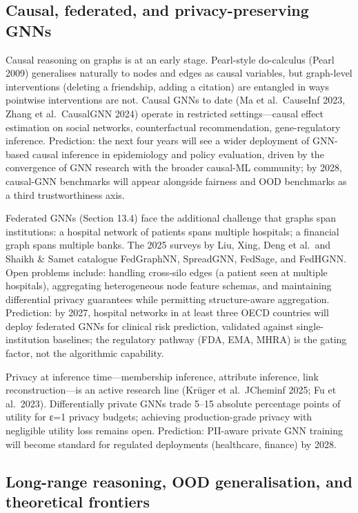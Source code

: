\subsection{Causal, federated, and privacy-preserving GNNs}\label{causal-federated-and-privacy-preserving-gnns}

Causal reasoning on graphs is at an early stage. Pearl-style do-calculus (Pearl 2009) generalises naturally to nodes and edges as causal variables, but graph-level interventions (deleting a friendship, adding a citation) are entangled in ways pointwise interventions are not. Causal GNNs to date (Ma et al.~CauseInf 2023, Zhang et al.~CausalGNN 2024) operate in restricted settings---causal effect estimation on social networks, counterfactual recommendation, gene-regulatory inference. Prediction: the next four years will see a wider deployment of GNN-based causal inference in epidemiology and policy evaluation, driven by the convergence of GNN research with the broader causal-ML community; by 2028, causal-GNN benchmarks will appear alongside fairness and OOD benchmarks as a third trustworthiness axis.

Federated GNNs (Section 13.4) face the additional challenge that graphs span institutions: a hospital network of patients spans multiple hospitals; a financial graph spans multiple banks. The 2025 surveys by Liu, Xing, Deng et al.~and Shaikh \& Samet catalogue FedGraphNN, SpreadGNN, FedSage, and FedHGNN. Open problems include: handling cross-silo edges (a patient seen at multiple hospitals), aggregating heterogeneous node feature schemas, and maintaining differential privacy guarantees while permitting structure-aware aggregation. Prediction: by 2027, hospital networks in at least three OECD countries will deploy federated GNNs for clinical risk prediction, validated against single-institution baselines; the regulatory pathway (FDA, EMA, MHRA) is the gating factor, not the algorithmic capability.

Privacy at inference time---membership inference, attribute inference, link reconstruction---is an active research line (Krüger et al.~JCheminf 2025; Fu et al.~2023). Differentially private GNNs trade 5--15 absolute percentage points of utility for ε=1 privacy budgets; achieving production-grade privacy with negligible utility loss remains open. Prediction: PII-aware private GNN training will become standard for regulated deployments (healthcare, finance) by 2028.

\subsection{Long-range reasoning, OOD generalisation, and theoretical frontiers}\label{long-range-reasoning-ood-generalisation-and-theoretical-frontiers}

